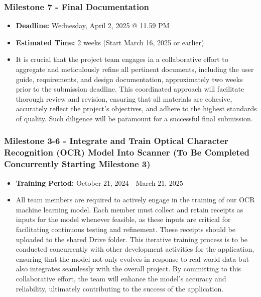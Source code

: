 \documentclass{article}
\begin{document}
\subsubsection*{Milestone 7 - Final Documentation}
\begin{itemize}
    \item \textbf{Deadline:} Wednesday, April 2, 2025 @ 11.59 PM
    \item \textbf{Estimated Time:} 2 weeks (Start March 16, 2025 or earlier)
    \item It is crucial that the project team engages in a collaborative effort to aggregate and meticulously refine all pertinent documents, including the user guide, requirements, and design documentation, approximately two weeks prior to the submission deadline. This coordinated approach will facilitate thorough review and revision, ensuring that all materials are cohesive, accurately reflect the project’s objectives, and adhere to the highest standards of quality. Such diligence will be paramount for a successful final submission.
\end{itemize}

\newpage

\subsubsection*{Milestone 3-6 - Integrate and Train Optical Character Recognition (OCR) Model Into Scanner (To Be Completed Concurrently Starting Milestone 3)}
\begin{itemize}
    \item \textbf{Training Period:} October 21, 2024 - March 21, 2025
    \item All team members are required to actively engage in the training of our OCR machine learning model. Each member must collect and retain receipts as inputs for the model whenever feasible, as these inputs are critical for facilitating continuous testing and refinement. These receipts should be uploaded to the shared Drive folder. This iterative training process is to be conducted concurrently with other development activities for the application, ensuring that the model not only evolves in response to real-world data but also integrates seamlessly with the overall project. By committing to this collaborative effort, the team will enhance the model’s accuracy and reliability, ultimately contributing to the success of the application.
\end{itemize}

\newpage
\end{document}
